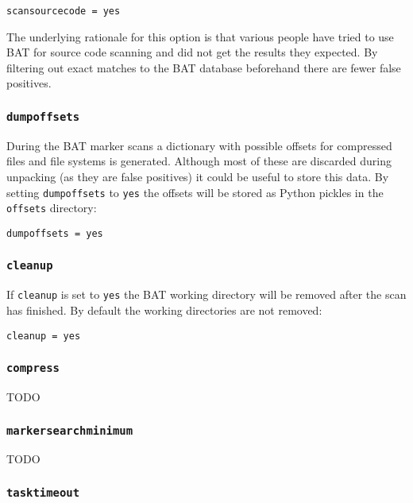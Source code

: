 \documentclass[10pt,a4paper]{article}
\begin{document}
\begin{verbatim}
scansourcecode = yes
\end{verbatim}

The underlying rationale for this option is that various people have tried to
use BAT for source code scanning and did not get the results they expected. By
filtering out exact matches to the BAT database beforehand there are fewer
false positives.

\subsubsection{\texttt{dumpoffsets}}

During the BAT marker scans a dictionary with possible offsets for compressed
files and file systems is generated. Although most of these are discarded
during unpacking (as they are false positives) it could be useful to store this
data. By setting \texttt{dumpoffsets} to \texttt{yes} the offsets will be
stored as Python pickles in the \texttt{offsets} directory:

\begin{verbatim}
dumpoffsets = yes
\end{verbatim}

\subsubsection{\texttt{cleanup}}

If \texttt{cleanup} is set to \texttt{yes} the BAT working directory will be
removed after the scan has finished. By default the working directories are not
removed:

\begin{verbatim}
cleanup = yes
\end{verbatim}

\subsubsection{\texttt{compress}}

TODO

\subsubsection{\texttt{markersearchminimum}}

TODO

\subsubsection{\texttt{tasktimeout}}
\end{document}

